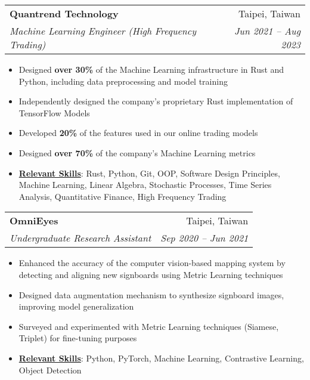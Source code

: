 \documentclass[letterpaper,11pt]{article}
\makeatletter
\newcommand{\resumeItem}[1]{
\item\small{
    {#1 \vspace{-2pt}}
  }
}
\newcommand{\resumeSubheading}[4]{
  \vspace{-2pt}
\item
  \begin{tabular*}{0.97\textwidth}[t]{l@{\extracolsep{\fill}}r}
    \textbf{#1} & #2 \\
    \textit{\small#3} & \textit{\small #4} \\
  \end{tabular*}\vspace{-7pt}
}
\newcommand{\resumeItemListStart}{
\begin{itemize}}
\newcommand{\resumeItemListEnd}{
  \end{itemize}\vspace{-5pt}}
\makeatother
\begin{document}

\resumeSubheading
{Quantrend Technology}{Taipei, Taiwan}
{Machine Learning Engineer (High Frequency Trading)}{Jun
2021 -- Aug 2023}
\resumeItemListStart
\resumeItem{Designed \textbf{over 30\%} of the Machine Learning
  infrastructure in Rust and Python, including data preprocessing and
model training}
\resumeItem{Independently designed the company's proprietary Rust
implementation of TensorFlow Models}
\resumeItem{Developed \textbf{20\%} of the features used in our
online trading models}
\resumeItem{Designed \textbf{over 70\%} of the company's Machine
Learning metrics}
\resumeItem{\textbf{\underline{Relevant Skills}}:
  Rust, Python, Git, OOP, Software Design Principles, Machine
  Learning, Linear Algebra, Stochastic Processes, Time Series
  Analysis, Quantitative Finance, High Frequency Trading
}
\resumeItemListEnd

\resumeSubheading
{OmniEyes}{Taipei, Taiwan}
{Undergraduate Research Assistant}{Sep 2020 -- Jun 2021}
\resumeItemListStart
\resumeItem{Enhanced the accuracy of the computer vision-based mapping system by
detecting and aligning new signboards using Metric Learning techniques}
\resumeItem{Designed data augmentation mechanism to synthesize
signboard images, improving model generalization}
\resumeItem{Surveyed and experimented with Metric Learning techniques
(Siamese, Triplet) for fine-tuning purposes}
\resumeItem{\textbf{\underline{Relevant Skills}}:
  Python, PyTorch, Machine Learning, Contrastive Learning, Object Detection
}
\resumeItemListEnd

\end{document}
